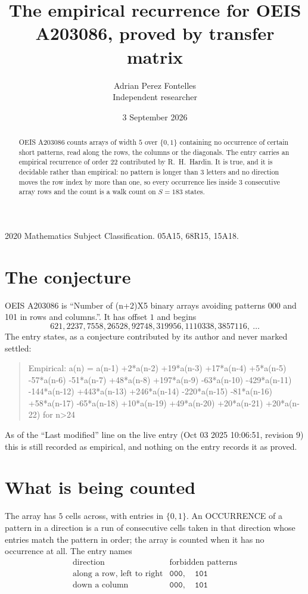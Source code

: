 \documentclass[11pt,a4paper]{article}
\title{The empirical recurrence for OEIS A203086, proved by transfer matrix}
\author{Adrian Perez Fontelles\\ \small Independent researcher}
\date{3 September 2026}
\theoremstyle{plain}
\theoremstyle{definition}
\begin{document}
\maketitle

\begin{abstract}
OEIS A203086 counts arrays of width $5$ over $\{0,1\}$ containing no occurrence of certain short
patterns, read along the rows, the columns or the diagonals. The entry carries an empirical
recurrence of order $22$ contributed by R.~H.~Hardin. It is true, and it is decidable
rather than empirical: no pattern is longer than $3$ letters and no direction moves the row
index by more than one, so every occurrence lies inside $3$ consecutive array rows and the
count is a walk count on $S=183$ states.
\end{abstract}

\noindent\small 2020 Mathematics Subject Classification. 05A15, 68R15, 15A18.\normalsize

\section{The conjecture}

OEIS A203086 is ``Number of (n+2)X5 binary arrays avoiding patterns 000 and 101 in rows and columns.''. It has offset $1$ and begins
\[
621, 2237, 7558, 26528, 92748, 319956, 1110338, 3857116,\ \dots
\]
The entry states, as a conjecture contributed by its author and never marked settled:
\begin{quote}
Empirical: a(n) = a(n-1) +2*a(n-2) +19*a(n-3) +17*a(n-4) +5*a(n-5) -57*a(n-6) -51*a(n-7) +48*a(n-8) +197*a(n-9) -63*a(n-10) -429*a(n-11) -144*a(n-12) +443*a(n-13) +246*a(n-14) -220*a(n-15) -81*a(n-16) +58*a(n-17) -65*a(n-18) +10*a(n-19) +49*a(n-20) +20*a(n-21) +20*a(n-22) for n>24
\end{quote}
As of the ``Last modified'' line on the live entry (Oct 03 2025 10:06:51, revision 9) this is still
recorded as empirical, and nothing on the entry records it as proved.

\section{What is being counted}

The array has $5$ cells across, with entries in $\{0,1\}$. An OCCURRENCE of a pattern in a
direction is a run of consecutive cells taken in that direction whose entries match the pattern
in order; the array is counted when it has no occurrence at all. The entry names
\[
\begin{array}{ll}
\text{direction} & \text{forbidden patterns} \\[2pt]
\text{along a row, left to right} & \mathtt{000},\quad \mathtt{101} \\
\text{down a column} & \mathtt{000},\quad \mathtt{101} \\
\end{array}
\]
\end{document}
